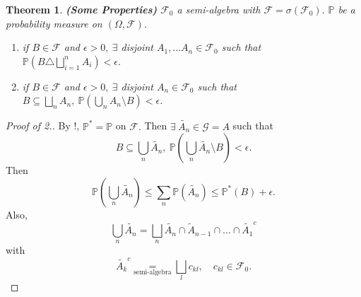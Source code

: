 \documentclass{article}
\newcommand{\1}{\mathds{1}}
\newcommand{\F}{\mathcal{F}}
\newcommand{\G}{\mathcal{G}}
\newcommand{\PB}{\mathbb{P}}
\newcommand{\lf}{\left}
\newcommand{\rg}{\right}
\newcommand{\sm}{\setminus}
\newtheorem{theorem}{Theorem}[section]
\begin{document}
\begin{theorem}\textbf{(Some Properties)}
    $\F_0$ a semi-algebra with $\F=\sigma(\F_0).$ $\PB$ be a probability measure on $(\Omega,\F).$
    \begin{enumerate}
        \item if $B\in\F$ and $\epsilon>0,\ \exists$ disjoint $A_1,...A_n\in\F_0$ such that $\PB(B\triangle \bigsqcup_{i=1}^n A_i)<\epsilon.$
        \item if $B\in\F$ and $\epsilon>0,\ \exists$ disjoint $A_n\in\F_0$ such that $B\subseteq\bigsqcup_n A_n,\ \PB(\bigcup_n A_n\sm B)<\epsilon.$
    \end{enumerate}
\end{theorem}
\begin{proof}[Proof of 2.]
    By !, $\PB^*=\PB$ on $\F.$ Then $\exists\ \tilde{A_n}\in\G=A$ such that $$B\subseteq\bigcup_n \tilde{A_n},\ \PB(\bigcup_n \tilde{A_n}\sm B)<\epsilon.$$ Then $$\PB\lf(\bigcup_n \tilde{A_n}\rg)\leq \sum_n \PB(\tilde{A_n})\leq \PB^*(B)+\epsilon.$$ Also, $$\bigcup_n \tilde{A_n}=\bigsqcup_n \tilde{A_n}\cap \tilde{A}_{n-1}\cap\ldots \cap \tilde{A_1}^c$$ with \[
\tilde{A_k}^c \underset{\text{semi-algebra}}{=} \bigsqcup_l c_{kl},\quad c_{kl} \in \mathcal{F}_0.
\]
\end{proof}
\end{document}
